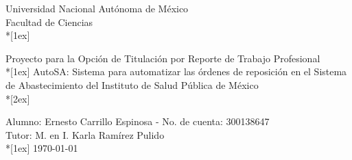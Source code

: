 \documentclass[letterpaper,11pt]{article}
\begin{document}
\begin{center}
\begin{Large}
Universidad Nacional Autónoma de México\\
Facultad de Ciencias\\*[1ex]
\end{Large}
\begin{LARGE}
Proyecto para la Opción de Titulación por Reporte de Trabajo Profesional\\*[1ex]
AutoSA: Sistema para automatizar las órdenes de reposición en el Sistema de Abastecimiento del Instituto de Salud Pública de México\\*[2ex]
\end{LARGE}
Alumno: Ernesto Carrillo Espinosa - No. de cuenta: 300138647\\
Tutor: M. en I. Karla Ramírez Pulido\\*[1ex]
\today
\end{center}
\end{document}
